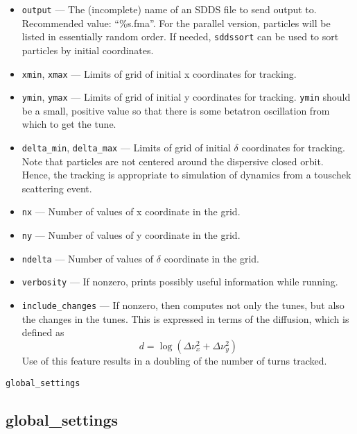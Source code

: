 \documentclass[11pt]{article}
\begin{document}
\begin{itemize}
\item \verb|output| --- The (incomplete) name of an SDDS file to send output to.  
 Recommended value: ``\%s.fma''.  For the parallel version, particles will be listed in essentially
 random order.  If needed, \verb|sddssort| can be used to sort particles by initial coordinates.
\item \verb|xmin|, \verb|xmax| --- Limits of grid of initial x coordinates for tracking.             
\item \verb|ymin|, \verb|ymax| --- Limits of grid of initial y coordinates for tracking.             
 \verb|ymin| should be a small, positive value so that there                               
 is some betatron oscillation from which to get the tune.                      
\item \verb|delta_min|, \verb|delta_max| --- Limits of grid of initial $\delta$ coordinates
for tracking.  Note that particles are not centered around the dispersive closed orbit.  Hence,
the tracking is appropriate to simulation of dynamics from a touschek scattering event.
\item \verb|nx| --- Number of values of x coordinate in the grid.
\item \verb|ny| --- Number of values of y coordinate in the grid.
\item \verb|ndelta| --- Number of values of $\delta$ coordinate in the grid.
\item \verb|verbosity| --- If nonzero, prints possibly useful information while running.
\item \verb|include_changes| --- If nonzero, then computes not only the tunes, but also
        the changes in the tunes.  This is expressed in terms of the diffusion, which is defined
        as 
\begin{equation}
  d = \log \left(\Delta\nu_x^2 + \Delta\nu_y^2\right)
\end{equation}
Use of this feature results in a doubling of the number of turns tracked.
\end{itemize}

\newpage
\begin{center}{\Large\verb|global_settings|}\end{center}
\subsection{global\_settings \label{subsec:globalsettings}}
\end{document}
